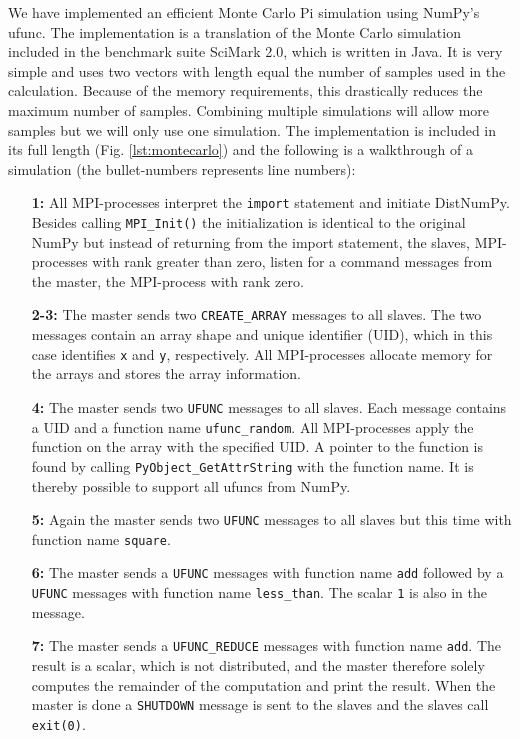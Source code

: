 \documentclass[10pt]{article}
\begin{document}
We have implemented an efficient Monte Carlo Pi simulation using NumPy's ufunc. The implementation is a translation of the Monte Carlo simulation included in the benchmark suite SciMark 2.0\cite{SciMark}, which is written in Java. It is very simple and uses two vectors with length equal the number of samples used in the calculation. Because of the memory requirements, this drastically reduces the maximum number of samples. Combining multiple simulations will allow more samples but we will only use one simulation. The implementation is included in its full length (Fig. \ref{lst:montecarlo}) and the following is a walkthrough of a simulation (the bullet-numbers represents line numbers):

\begin{enumerate}
\item[\textbf{1:}] All MPI-processes interpret the \texttt{import} statement and initiate DistNumPy. Besides calling \texttt{MPI\_Init()} the initialization is identical to the original NumPy but instead of returning from the import statement, the slaves, MPI-processes with rank greater than zero, listen for a command messages from the master, the MPI-process with rank zero.
\item[\textbf{2-3:}] The master sends two \texttt{CREATE\_ARRAY} messages to all slaves. The two messages contain an array shape and unique identifier (UID), which in this case identifies \texttt{x} and \texttt{y}, respectively. All MPI-processes allocate memory for the arrays and stores the array information.
\item[\textbf{4:}] The master sends two \texttt{UFUNC} messages to all slaves. Each message contains a UID and a function name \texttt{ufunc\_random}. All MPI-processes apply the function on the array with the specified UID. A pointer to the function is found by calling \texttt{PyObject\_GetAttrString} with the function name. It is thereby possible to support all ufuncs from NumPy.
\item[\textbf{5:}] Again the master sends two \texttt{UFUNC} messages to all slaves but this time with function name \texttt{square}.
\item[\textbf{6:}] The master sends a \texttt{UFUNC} messages with function name \texttt{add} followed by a \texttt{UFUNC} messages with function name \texttt{less\_than}. The scalar \texttt{1} is also in the message.
\item[\textbf{7:}] The master sends a \texttt{UFUNC\_REDUCE} messages with function name \texttt{add}. The result is a scalar, which is not distributed, and the master therefore solely computes the remainder of the computation and print the result. When the master is done a \texttt{SHUTDOWN} message is sent to the slaves and the slaves call \texttt{exit(0)}.
\end{enumerate}
\end{document}
